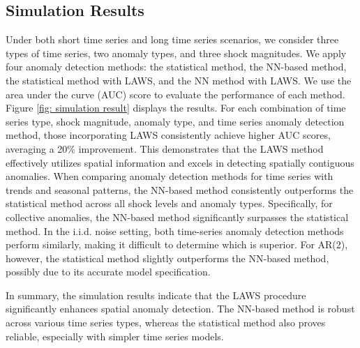 \documentclass[11pt]{article}
\begin{document}
\subsection{Simulation Results}
Under both short time series and long time series scenarios, we consider three types of time series, two anomaly types, and three shock magnitudes. We apply four anomaly detection methods: the statistical method, the NN-based method, the statistical method with LAWS, and the NN method with LAWS. We use the area under the curve (AUC) score to evaluate the performance of each method. Figure \ref{fig: simulation result} displays the results. For each combination of time series type, shock magnitude, anomaly type, and time series anomaly detection method, those incorporating LAWS consistently achieve higher AUC scores, averaging a 20\% improvement. This demonstrates that the LAWS method effectively utilizes spatial information and excels in detecting spatially contiguous anomalies. When comparing anomaly detection methods for time series with trends and seasonal patterns, the NN-based method consistently outperforms the statistical method across all shock levels and anomaly types. Specifically, for collective anomalies, the NN-based method significantly surpasses the statistical method. In the i.i.d. noise setting, both time-series anomaly detection methods perform similarly, making it difficult to determine which is superior. For AR(2), however, the statistical method slightly outperforms the NN-based method, possibly due to its accurate model specification.

In summary, the simulation results indicate that the LAWS procedure significantly enhances spatial anomaly detection. The NN-based method is robust across various time series types, whereas the statistical method also proves reliable, especially with simpler time series models.
\end{document}

